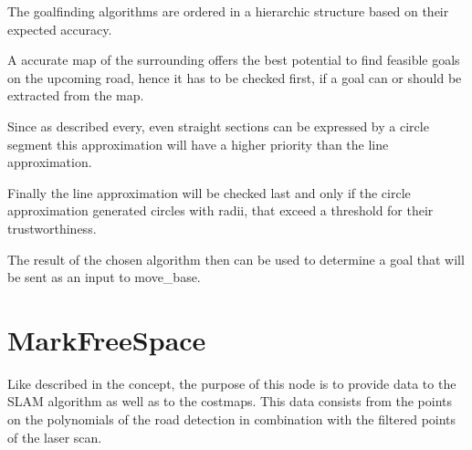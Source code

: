 The goalfinding algorithms are ordered in a hierarchic structure based on their expected accuracy.

A accurate map of the surrounding offers the best potential to find feasible goals on the upcoming road, hence it has to be checked first, if a goal can or should be extracted from the map.

Since as described every, even straight sections can be expressed by a circle segment this approximation will have a higher priority than the line approximation.

Finally the line approximation will be checked last and only if the circle approximation generated circles with radii, that exceed a threshold for their trustworthiness.

The result of the chosen algorithm then can be used to determine a goal that will be sent as an input to move\_base.

\begin{table}[H]
\centering
{}
\label{posefinderparams}
\caption{PoseFined parameters}
\end{table}

\section{MarkFreeSpace}

Like described in the concept, the purpose of this node is to provide data to the SLAM algorithm as well as to the costmaps. This data consists from the points on the polynomials of the road detection in combination with the filtered points of the laser scan.\\

